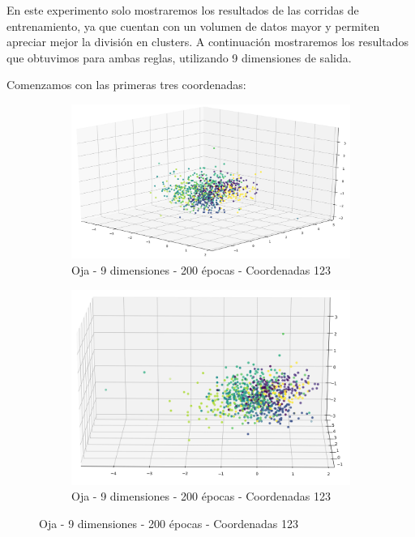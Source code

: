 En este experimento solo mostraremos los resultados de las corridas de entrenamiento, ya que cuentan con un volumen de datos mayor y permiten apreciar mejor la división en clusters. A continuación mostraremos los resultados que obtuvimos para ambas reglas, utilizando 9 dimensiones de salida.

Comenzamos con las primeras tres coordenadas:

\begin{figure}[!htbp]
\centering
\begin{subfigure}{.5\textwidth}
  \centering
  \includegraphics[width=1\linewidth, scale=1]{../img/ej1/oja_corrida_200_9/oja_9salida_200ep_testing_dim123.png}
  \caption{Oja - 9 dimensiones - 200 épocas - Coordenadas 123}
  \label{fig:sub1}
\end{subfigure}%
\begin{subfigure}{.5\textwidth}
  \centering
  \includegraphics[width=1\linewidth, scale=1]{../img/ej1/oja_corrida_200_9/oja_9salida_200ep_testing_dim123_2.png}
  \caption{Oja - 9 dimensiones - 200 épocas - Coordenadas 123}
  \label{fig:sub2}
\end{subfigure}
\end{figure}

